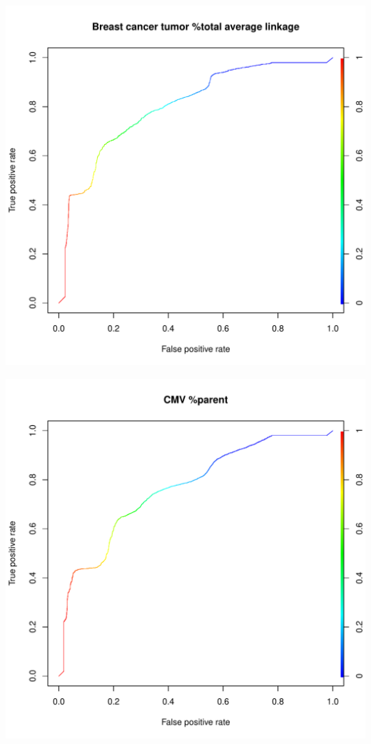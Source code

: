 \documentclass[11pt,a4paper,twoside]{report}\usepackage[]{graphicx}\usepackage[]{color}
\makeatletter
\def\maxwidth{ %
  \ifdim\Gin@nat@width>\linewidth
    \linewidth
  \else
    \Gin@nat@width
  \fi
}
\newenvironment{knitrout}{}{} %
\makeatother
\begin{document}
\begin{knitrout}
\includegraphics[width=\maxwidth]{figure/fig_code-5} 

\includegraphics[width=\maxwidth]{figure/fig_code-6} 


\end{knitrout}
\end{document}
